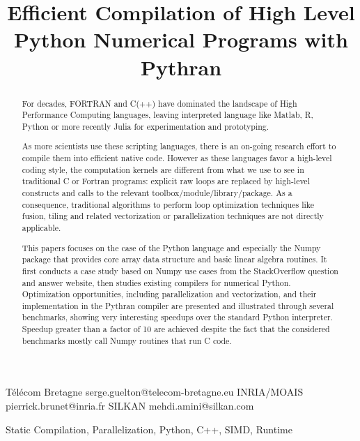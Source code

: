 \documentclass[10pt, preprint]{sigplanconf}
\begin{document}
\title{Efficient Compilation of High Level Python Numerical Programs with Pythran}

           {T{\'e}l{\'e}com Bretagne}
           {serge.guelton@telecom-bretagne.eu}
           {INRIA/MOAIS}
           {pierrick.brunet@inria.fr}
           {SILKAN}
           {mehdi.amini@silkan.com}

\maketitle

\begin{abstract}

    For decades, FORTRAN and C(++) have dominated the landscape of High
    Performance Computing languages, leaving interpreted language like Matlab,
    R, Python or more recently Julia for experimentation and prototyping.

    As more scientists use these scripting languages, there is an on-going
    research effort to compile them into efficient native code. However as
    these languages favor a high-level coding style, the computation kernels are
    different from what we use to see in traditional C or Fortran programs:
    explicit raw loops are replaced by high-level constructs and calls to the
    relevant toolbox/module/library/package. As a consequence, traditional
    algorithms to perform
    loop optimization techniques like fusion, tiling and related
    vectorization or parallelization techniques are not directly applicable.

    This papers focuses on the case of the Python language and especially the
    Numpy package that provides core array data structure and basic linear
    algebra routines. It first conducts a case study based on Numpy use
    cases from the StackOverflow question and answer website, then studies
    existing compilers for numerical Python. Optimization opportunities,
    including parallelization and vectorization, and their implementation in
    the Pythran compiler are presented and illustrated through several
    benchmarks, showing very interesting speedups over the standard Python
    interpreter. Speedup greater than a factor of 10 are achieved despite the
    fact that the considered benchmarks mostly call Numpy routines that run C code.

\end{abstract}


\keywords
Static Compilation, Parallelization, Python, C++, SIMD, Runtime
\end{document}
